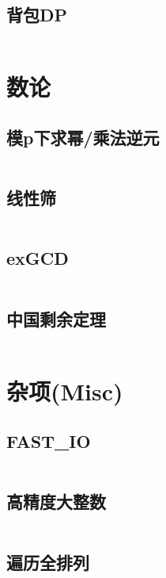 \documentclass[openany,a4paper]{book}
\begin{document}
\section{背包DP}
\inputminted{cpp}{Algorithm/dp.h}

\chapter{数论}

\section{模p下求幂/乘法逆元}
\inputminted{cpp}{NumberTheory/modPow.h}

\section{线性筛}
\inputminted{cpp}{NumberTheory/linearSieve.h}

\section{exGCD}
\inputminted{cpp}{NumberTheory/exgcd.h}

\section{中国剩余定理}
\inputminted{cpp}{NumberTheory/CRT.h}

\chapter{杂项(Misc)}

\section{FAST\_IO}
\inputminted{cpp}{Misc/fast_io.h}

\section{高精度大整数}
\inputminted{cpp}{Misc/BigInt.h}

\section{遍历全排列}
\inputminted{cpp}{Misc/next_permutation.h}
\end{document}
